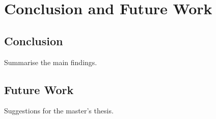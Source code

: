 \chapter{Conclusion and Future Work}
\label{ch:conclusion}

\section{Conclusion}
Summarise the main findings.

\section{Future Work}
Suggestions for the master's thesis.
